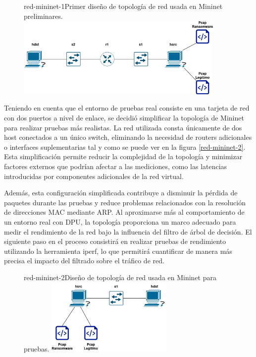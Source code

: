 \begin{figure}[Primera Topología de Red]{red-mininet-1}{Primer diseño de topología de red usada en Mininet preliminares.}
	\includegraphics[width=0.9\textwidth]{capturas/DiagramaRedArbol1.png}
\end{figure}

Teniendo en cuenta que el entorno de pruebas real consiste en una tarjeta de red con dos puertos a nivel de enlace, se decidió simplificar la topología de Mininet para realizar pruebas más realistas. La red utilizada consta únicamente de dos host conectados a un único switch, eliminando la necesidad de routers adicionales o interfaces suplementarias tal y como se puede ver en la figura \ref{red-mininet-2}. Esta simplificación permite reducir la complejidad de la topología y minimizar factores externos que podrían afectar a las mediciones, como las latencias introducidas por componentes adicionales de la red virtual.

Además, esta configuración simplificada contribuye a disminuir la pérdida de paquetes durante las pruebas y reduce problemas relacionados con la resolución de direcciones MAC mediante ARP. Al aproximarse más al comportamiento de un entorno real con DPU, la topología proporciona un marco adecuado para medir el rendimiento de la red bajo la influencia del filtro de árbol de decisión. El siguiente paso en el proceso consistirá en realizar pruebas de rendimiento utilizando la herramienta iperf, lo que permitirá cuantificar de manera más precisa el impacto del filtrado sobre el tráfico de red.

\begin{figure}[Topología de Red Final]{red-mininet-2}{Diseño de topología de red usada en Mininet para pruebas.}
	\includegraphics[width=0.55\textwidth]{capturas/DiagramaRed2.png}
\end{figure}

